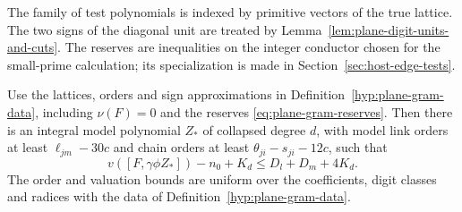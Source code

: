 The family of test polynomials is indexed by primitive vectors of the true lattice. The two signs of the diagonal unit are treated by Lemma~\ref{lem:plane-digit-units-and-cuts}. The reserves are inequalities on the integer conductor chosen for the small-prime calculation; its specialization is made in Section~\ref{sec:host-edge-tests}.


\begin{proposition}\label{prop:plane-corrected-gram-polynomial}
Use the lattices, orders and sign approximations in
Definition~\ref{hyp:plane-gram-data}, including \(\nu(F)=0\)
and the reserves \eqref{eq:plane-gram-reserves}.
Then there is an integral model polynomial \(Z_*\) of collapsed
degree \(d\), with model link orders at least
\(\ell_{jm}-30c\) and chain orders at least
\(\theta_{ji}-s_{ji}-12c\), such that
\[
 v([F,\gamma\phi Z_*])-n_0+K_d
                               \le D_l+D_m+4K_d.
\]
The order and valuation bounds are uniform over the coefficients,
digit classes and radices with the data of Definition~\ref{hyp:plane-gram-data}.
\end{proposition}

